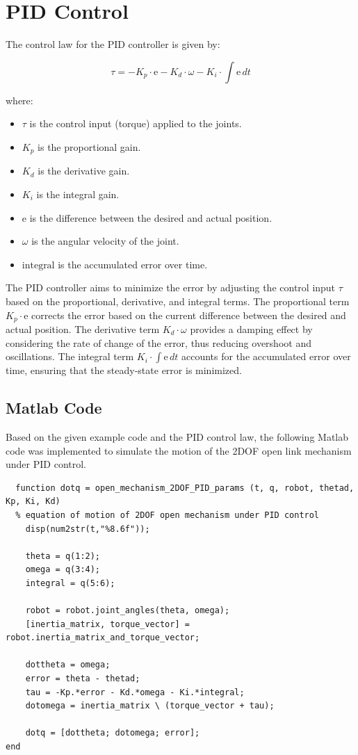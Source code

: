 \documentclass{article}
\begin{document}
\section*{PID Control}
The control law for the PID controller is given by:

\[
\tau = -K_p \cdot \text{e} - K_d \cdot \omega - K_i \cdot \int \text{e} \, dt
\]

where:
\begin{itemize}
  \item \(\tau\) is the control input (torque) applied to the joints.
  \item \(K_p\) is the proportional gain.
  \item \(K_d\) is the derivative gain.
  \item \(K_i\) is the integral gain.
  \item \(\text{e}\) is the difference between the desired and actual position.
  \item \(\omega\) is the angular velocity of the joint.
  \item \(\text{integral}\) is the accumulated error over time.
\end{itemize}
The PID controller aims to minimize the error by adjusting the control input \(\tau\) based on the proportional, derivative, and integral terms. The proportional term \(K_p \cdot \text{e}\) corrects the error based on the current difference between the desired and actual position. The derivative term \(K_d \cdot \omega\) provides a damping effect by considering the rate of change of the error, thus reducing overshoot and oscillations. The integral term \(K_i \cdot \int \text{e} \, dt\) accounts for the accumulated error over time, ensuring that the steady-state error is minimized.

\newpage

\subsection*{Matlab Code}
Based on the given example code and the PID control law, the following Matlab code was implemented to simulate the motion of the 2DOF open link mechanism under PID control.

\begin{verbatim}
  function dotq = open_mechanism_2DOF_PID_params (t, q, robot, thetad, Kp, Ki, Kd)
  % equation of motion of 2DOF open mechanism under PID control
    disp(num2str(t,"%8.6f"));
    
    theta = q(1:2);
    omega = q(3:4);
    integral = q(5:6);
    
    robot = robot.joint_angles(theta, omega);
    [inertia_matrix, torque_vector] = robot.inertia_matrix_and_torque_vector;
    
    dottheta = omega;
    error = theta - thetad;
    tau = -Kp.*error - Kd.*omega - Ki.*integral;
    dotomega = inertia_matrix \ (torque_vector + tau);
    
    dotq = [dottheta; dotomega; error];
end

\end{verbatim}
\end{document}
